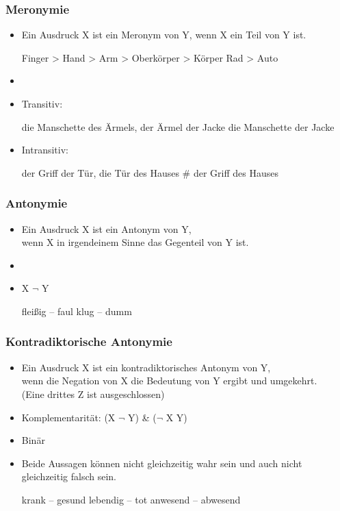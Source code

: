 \begin{frame}
\frametitle{Meronymie}

\begin{itemize}
	\item 
Ein Ausdruck X ist ein Meronym von Y, wenn X ein Teil von Y ist.

\vspace{5mm}
	
	\eal
	\ex Finger > Hand > Arm > Oberkörper > Körper
	\ex Rad > Auto
	\zl
	
	\item[]
	\item Transitiv: 
		
	\ea die Manschette des Ärmels, der Ärmel der Jacke \ras die Manschette der Jacke
	\z
		
	\item Intransitiv: 
		
	\ea der Griff der Tür, die Tür des Hauses \ras \# der Griff des Hauses
	\z
		
\end{itemize}

\end{frame}



\begin{frame}
\frametitle{Antonymie}

\begin{itemize}
	\item 
Ein Ausdruck X ist ein Antonym von Y,\\
wenn X in irgendeinem Sinne das Gegenteil von Y ist.
	\item[]	
	\item X \ras $\lnot$ Y
	
	\eal 
		\ex fleißig -- faul
		\ex klug -- dumm
	\zl
	
\end{itemize}

\end{frame}



\begin{frame}
\frametitle{Kontradiktorische Antonymie}

\begin{itemize}
	\item 
Ein Ausdruck X ist ein kontradiktorisches Antonym von Y,\\
wenn die Negation von X die Bedeutung von Y ergibt und umgekehrt.\\
(Eine drittes Z ist ausgeschlossen)
	\item Komplementarität: (X \ras $\lnot$ Y) \& ($\lnot$ X  \ras Y)
	\item Binär
	\item Beide Aussagen können nicht gleichzeitig wahr sein und auch nicht gleichzeitig falsch sein.
	
	\eal
		\ex krank -- gesund
		\ex lebendig -- tot
		\ex anwesend -- abwesend
	\zl
	
\end{itemize}

\end{frame}


